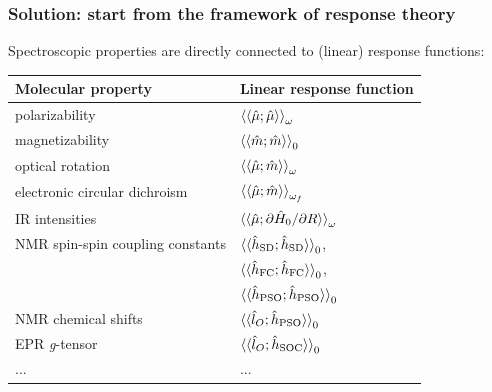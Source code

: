 \documentclass[%
    xcolor=usenames,dvipsnames,svgnames%
]{beamer}
\begin{document}
\begin{frame}
  \frametitle{Solution: start from the framework of response theory}
  Spectroscopic properties are directly connected to (linear) response functions:
  \begin{table}
    \centering
    \begin{tabular}{ll}
      \toprule
      \textbf{Molecular property}       & \textbf{Linear response function} \\
      \midrule
      polarizability                    & \( \braket{\braket{\hat{\mu};\hat{\mu}}}_{\omega} \) \\
      magnetizability                   & \( \braket{\braket{\hat{m};\hat{m}}}_{0} \) \\
      optical rotation                  & \( \braket{\braket{\hat{\mu};\hat{m}}}_{\omega} \) \\
      electronic circular dichroism     & \( \braket{\braket{\hat{\mu};\hat{m}}}_{\omega_{f}} \) \\
      IR intensities                    & \( \braket{\braket{\hat{\mu};\partial\hat{H}_{0}/\partial R}}_{\omega} \) \\
      NMR spin-spin coupling constants  & \( \braket{\braket{\hat{h}_{\text{SD}};\hat{h}_{\text{SD}}}}_{0} \), \\
                                        & \( \braket{\braket{\hat{h}_{\text{FC}};\hat{h}_{\text{FC}}}}_{0} \), \\
                                        & \( \braket{\braket{\hat{h}_{\text{PSO}};\hat{h}_{\text{PSO}}}}_{0} \) \\
      NMR chemical shifts               & \( \braket{\braket{\hat{l}_{O};\hat{h}_{\text{PSO}}}}_{0} \) \\
      EPR \textit{g}-tensor             & \( \braket{\braket{\hat{l}_{O};\hat{h}_{\text{SOC}}}}_{0} \) \\
      ... & ... \\
      \bottomrule
    \end{tabular}
  \end{table}
\end{frame}
\end{document}
